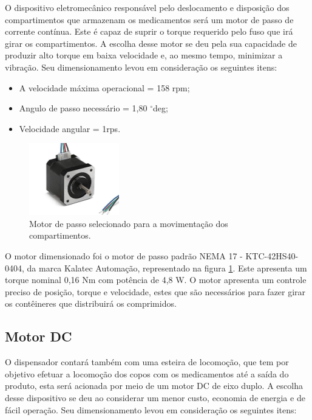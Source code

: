  O dispositivo eletromecânico responsável pelo deslocamento e disposição dos compartimentos que armazenam os medicamentos será um motor de passo de corrente contínua. Este é capaz de suprir o torque requerido pelo fuso que irá girar os compartimentos. A escolha desse motor se deu pela sua capacidade de produzir alto torque em baixa velocidade e, ao mesmo tempo, minimizar a vibração. Seu dimensionamento levou em consideração os seguintes itens: 

\begin{itemize}
    \item A velocidade máxima operacional = 158 rpm;
    \item Angulo de passo necessário = 1,80 $^\circ$deg;
    \item Velocidade angular = 1rps.
\end{itemize}

 \begin{figure}[H]
\centering
    \includegraphics[width=0.35\textwidth]{figuras/Energia_passo.PNG}
    \caption{Motor de passo selecionado para a movimentação dos compartimentos.}
    \label{fig:energia_passo}
\end{figure}

 O motor dimensionado foi o motor de passo padrão NEMA 17 - KTC-42HS40-0404, da marca Kalatec Automação, representado na figura \ref{fig:energia_passo}. Este apresenta um torque nominal 0,16 Nm com potência de 4,8 W. O motor apresenta um controle preciso de posição, torque e velocidade, estes que são necessários para fazer girar os contêineres que distribuirá os comprimidos.
 
 \subsection{Motor DC}\label{energ:motor_dc}

O dispensador contará também com uma esteira de locomoção, que tem por objetivo efetuar a locomoção dos copos com os medicamentos até a saída do produto, esta será acionada por meio de um motor DC de eixo duplo. A escolha desse dispositivo se deu ao considerar um menor custo, economia de energia e de fácil operação. Seu dimensionamento levou em consideração os seguintes itens:

